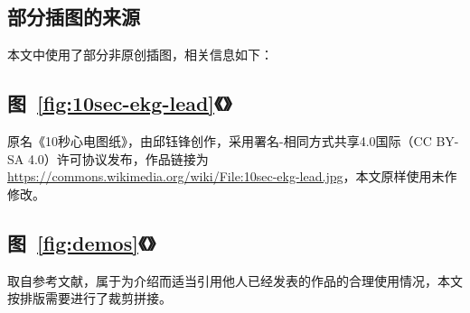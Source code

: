 

\begin{appendix}

    \begingroup
    \renewcommand{\clearpage}{\relax}
    \listoftodos
    \endgroup

    \listoffigures
    \listoffigureEng


    \chapter*{部分插图的来源}\label{ch:license}

    本文中使用了部分非原创插图，相关信息如下：

    \section*{图~\ref{fig:10sec-ekg-lead}《》}

    原名《10秒心电图纸》，由邱钰锋创作，采用署名-相同方式共享4.0国际（CC BY-SA 4.0）许可协议发布，作品链接为 \url{https://commons.wikimedia.org/wiki/File:10sec-ekg-lead.jpg}，本文原样使用未作修改。

    \section*{图~\ref{fig:demos}《》}

    取自参考文献\cite{chenJiyushenduxuexidexindianfenximoxingdeshejiyuyouhua2021,liuJiyuyidongzhongduanfenxidekechuandairouxingxindianjiancexitong2021,jinPredictingCardiovascularDisease2009}，属于为介绍而适当引用他人已经发表的作品的合理使用情况，本文按排版需要进行了裁剪拼接。

\end{appendix}
